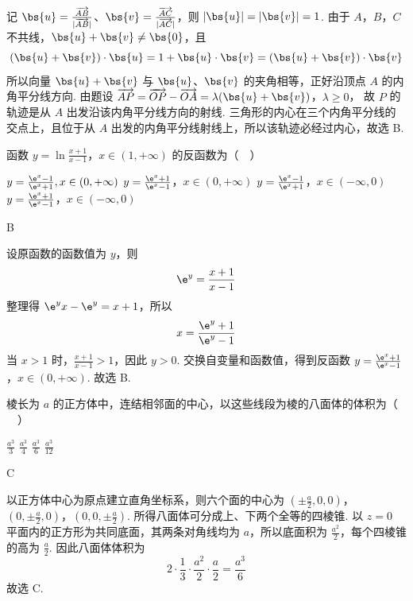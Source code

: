 \begin{solution}
记 \(\bs{u}=\frac{\overrightarrow{AB}}{|\overrightarrow{AB}|}\)、\(\bs{v}=\frac{\overrightarrow{AC}}{|\overrightarrow{AC}|}\)，则 \(|\bs{u}|=|\bs{v}|=1\). 由于 \(A\)，\(B\)，\(C\) 不共线，\(\bs{u}+\bs{v}\ne\bs{0}\)，且
\[
(\bs{u}+\bs{v})\cdot\bs{u}=1+\bs{u}\cdot\bs{v}=(\bs{u}+\bs{v})\cdot\bs{v}
\]
所以向量 \(\bs{u}+\bs{v}\) 与 \(\bs{u}\)、\(\bs{v}\) 的夹角相等，正好沿顶点 \(A\) 的内角平分线方向. 由题设
\(\overrightarrow{AP}=\overrightarrow{OP}-\overrightarrow{OA}=\lambda(\bs{u}+\bs{v})\)，\(\lambda\geqslant0\)，
故 \(P\) 的轨迹是从 \(A\) 出发沿该内角平分线方向的射线. 三角形的内心在三个内角平分线的交点上，且位于从 \(A\) 出发的内角平分线射线上，所以该轨迹必经过内心，故选 B.
\end{solution}

\begin{problem}
函数 \(y = \ln \frac{x + 1}{x - 1}\)，\(x \in (1,+\infty)\) 的反函数为（\(\quad\)）

\choices
    {\(y = \frac{\e^x - 1}{\e^x + 1}, x \in (0,+\infty)\)}
    {\(y = \frac{\e^x + 1}{\e^x - 1}\)，\(x \in (0,+\infty)\)}
    {\(y = \frac{\e^x - 1}{\e^x + 1}\)，\(x \in (-\infty,0)\)}
    {\(y = \frac{\e^x + 1}{\e^x - 1}\)，\(x \in (-\infty,0)\)}
\end{problem}

\begin{answer}
B
\end{answer}

\begin{solution}
设原函数的函数值为 \(y\)，则
\[
\e^y=\frac{x+1}{x-1}
\]
整理得 \(\e^y x-\e^y=x+1\)，所以
\[
x=\frac{\e^y+1}{\e^y-1}
\]
当 \(x>1\) 时，\(\frac{x+1}{x-1}>1\)，因此 \(y>0\). 交换自变量和函数值，得到反函数
\(y=\frac{\e^x+1}{\e^x-1}\)，\(x\in(0,+\infty)\).
故选 B.
\end{solution}

\begin{problem}
棱长为 \(a\) 的正方体中，连结相邻面的中心，以这些线段为棱的八面体的体积为（\(\quad\)）

\choices
    {\(\frac{a^3}{3}\)}
    {\(\frac{a^3}{4}\)}
    {\(\frac{a^3}{6}\)}
    {\(\frac{a^3}{12}\)}
\end{problem}

\begin{answer}
C
\end{answer}

\begin{solution}
以正方体中心为原点建立直角坐标系，则六个面的中心为
\(\left(\pm\frac a2,0,0\right)\)，\(\left(0,\pm\frac a2,0\right)\)，\(\left(0,0,\pm\frac a2\right)\).
所得八面体可分成上、下两个全等的四棱锥. 以 \(z=0\) 平面内的正方形为共同底面，其两条对角线均为 \(a\)，所以底面积为 \(\frac{a^2}{2}\)，每个四棱锥的高为 \(\frac a2\). 因此八面体体积为
\[
2\cdot\frac13\cdot\frac{a^2}{2}\cdot\frac a2=\frac{a^3}{6}
\]
故选 C.
\end{solution}

